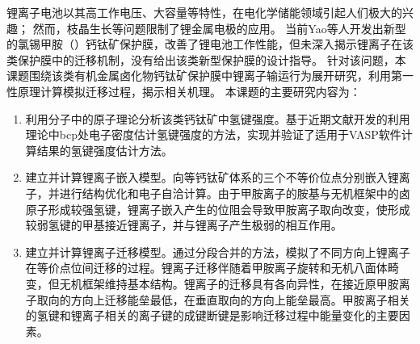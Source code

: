 
\begin{cabstract}

锂离子电池以其高工作电压、大容量等特性，在电化学储能领域引起人们极大的兴趣；
然而，枝晶生长等问题限制了锂金属电极的应用。
当前Yao等人开发出新型的氯锡甲胺（）钙钛矿保护膜，改善了锂电池工作性能，但未深入揭示锂离子在该类保护膜中的迁移机制，没有给出该类新型保护膜的设计指导。
针对该问题，本课题围绕该类有机金属卤化物钙钛矿保护膜中锂离子输运行为展开研究，利用第一性原理计算模拟迁移过程，揭示相关机理。
本课题的主要研究内容为：
\begin{enumerate}
    \item 利用分子中的原子理论分析该类钙钛矿中氢键强度。基于近期文献开发的利用理论中bcp处电子密度估计氢键强度的方法，实现并验证了适用于VASP软件计算结果的氢键强度估计方法。
    \item 建立并计算锂离子嵌入模型。向等钙钛矿体系的三个不等价位点分别嵌入锂离子，并进行结构优化和电子自洽计算。由于甲胺离子的胺基与无机框架中的卤原子形成较强氢键，锂离子嵌入产生的位阻会导致甲胺离子取向改变，使形成较弱氢键的甲基接近锂离子，并与锂离子产生极弱的相互作用。
    \item 建立并计算锂离子迁移模型。通过分段合并的方法，模拟了不同方向上锂离子在等价点位间迁移的过程。锂离子迁移伴随着甲胺离子旋转和无机八面体畸变，但无机框架维持基本结构。锂离子的迁移具有各向异性，在接近原甲胺离子取向的方向上迁移能垒最低，在垂直取向的方向上能垒最高。甲胺离子相关的氢键和锂离子相关的离子键的成键断键是影响迁移过程中能量变化的主要因素。
\end{enumerate}

\end{cabstract}

